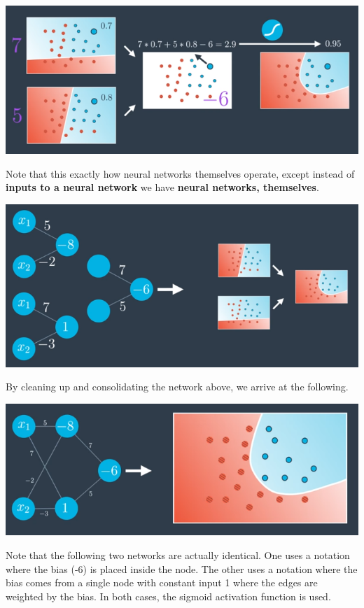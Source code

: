 \includegraphics[width=1\linewidth]{img//intro//introNN/neural-network-architecture-5.png}

Note that this exactly how neural networks themselves operate, except instead of \textbf{inputs to a neural network} we have \textbf{neural networks, themselves}.

\includegraphics[width=1\linewidth]{img//intro//introNN/neural-network-architecture-6.png}

By cleaning up and consolidating the network above, we arrive at the following.

\includegraphics[width=1\linewidth]{img//intro//introNN/neural-network-architecture-7.png}

Note that the following two networks are actually identical. One uses a notation where the bias (-6) is placed inside the node. The other uses a notation where the bias comes from a single node with constant input 1 where the edges are weighted by the bias. In both cases, the sigmoid activation function is used.

